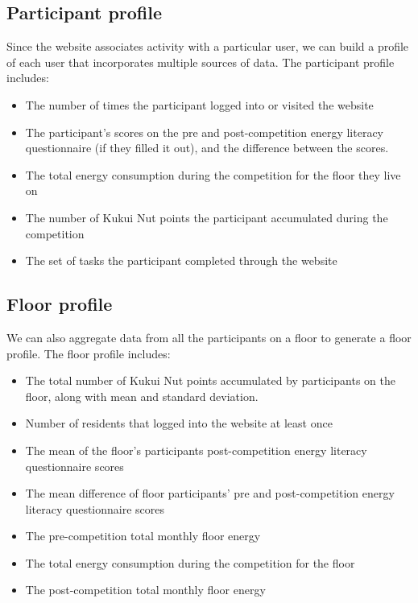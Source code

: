 \subsection{Participant profile}

Since the website associates activity with a particular user, we can build a profile of each user that incorporates multiple sources of data. The participant profile includes:

\begin{itemize}
\item The number of times the participant logged into or visited the website
\item The participant's scores on the pre and post-competition energy literacy questionnaire (if they filled it out), and the difference between the scores.
\item The total energy consumption during the competition for the floor they live on
\item The number of Kukui Nut points the participant accumulated during the competition
\item The set of tasks the participant completed through the website
\end{itemize}

\subsection{Floor profile}

We can also aggregate data from all the participants on a floor to generate a floor profile. The floor profile includes:

\begin{itemize}
\item The total number of Kukui Nut points accumulated by participants on the floor, along with mean and standard deviation.
\item Number of residents that logged into the website at least once
\item The mean of the floor's participants post-competition energy literacy questionnaire scores
\item The mean difference of floor participants' pre and post-competition energy literacy questionnaire scores
\item The pre-competition total monthly floor energy
\item The total energy consumption during the competition for the floor
\item The post-competition total monthly floor energy
\end{itemize}

